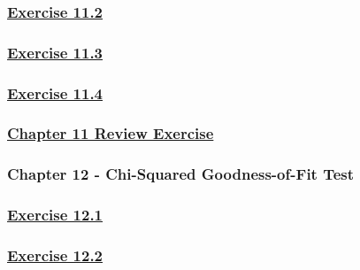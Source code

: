 \documentclass[
  11pt,
]{book}
\begin{document}
\subsubsection*{\texorpdfstring{\hyperref[ex112q]{Exercise 11.2}}{Exercise 11.2}}\label{exercise-11.2-1}

\subsubsection*{\texorpdfstring{\hyperref[ex113q]{Exercise 11.3}}{Exercise 11.3}}\label{exercise-11.3-1}

\subsubsection*{\texorpdfstring{\hyperref[ex114q]{Exercise 11.4}}{Exercise 11.4}}\label{exercise-11.4-1}

\subsubsection*{\texorpdfstring{\hyperref[re11q]{Chapter 11 Review Exercise}}{Chapter 11 Review Exercise}}\label{chapter-11-review-exercise}

\subsubsection*{Chapter 12 - Chi-Squared Goodness-of-Fit Test}\label{chapter-12---chi-squared-goodness-of-fit-test}

\subsubsection*{\texorpdfstring{\hyperref[ex121q]{Exercise 12.1}}{Exercise 12.1}}\label{exercise-12.1-1}

\subsubsection*{\texorpdfstring{\hyperref[ex122q]{Exercise 12.2}}{Exercise 12.2}}\label{exercise-12.2-1}
\end{document}
